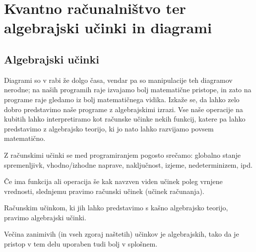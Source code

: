 \section{Kvantno računalništvo ter algebrajski učinki in diagrami}

\subsection{Algebrajski učinki}

Diagrami so v rabi že dolgo časa, vendar pa so manipulacije teh diagramov nerodne;
na naših programih raje izvajamo bolj matematične pristope, in zato na programe raje gledamo iz bolj matematičnega vidika. Izkaže se, da lahko zelo dobro predstavimo naše programe z algebrajskimi izrazi.
Vse naše operacije na kubitih lahko interpretiramo kot računske učinke nekih funkcij, katere pa lahko predstavimo z algebrajsko teorijo, ki jo nato lahko razvijamo povsem matematično.

Z računskimi učinki se med programiranjem pogosto srečamo: globalno stanje spremenljivk, vhodno/izhodne naprave, naključnost, izjeme, nedeterminizem, ipd.

\begin{definition}
    Če ima funkcija ali operacija še kak navzven viden učinek poleg vrnjene vrednosti, slednjemu pravimo računski učinek (učinek računanja).
\end{definition}

\begin{definition}
    Računskim učinkom, ki jih lahko predstavimo s kašno algebrajsko teorijo, pravimo algebrajski učinki.
\end{definition}

Večina zanimivih (in vseh zgoraj naštetih) učinkov je algebrajskih, tako da je pristop v tem delu uporaben tudi bolj v splošnem.

